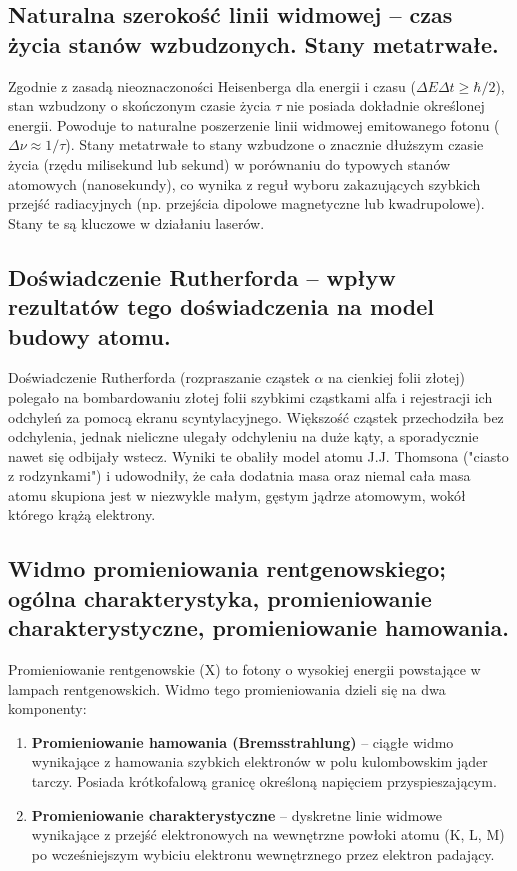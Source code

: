 \documentclass[11pt,a4paper]{article}
\begin{document}
\subsection{Naturalna szerokość linii widmowej -- czas życia stanów wzbudzonych. Stany metatrwałe.}
Zgodnie z zasadą nieoznaczoności Heisenberga dla energii i czasu ($\Delta E \Delta t \ge \hbar/2$), stan wzbudzony o skończonym czasie życia $\tau$ nie posiada dokładnie określonej energii. Powoduje to naturalne poszerzenie linii widmowej emitowanego fotonu ($\Delta \nu \approx 1/\tau$). Stany metatrwałe to stany wzbudzone o znacznie dłuższym czasie życia (rzędu milisekund lub sekund) w porównaniu do typowych stanów atomowych (nanosekundy), co wynika z reguł wyboru zakazujących szybkich przejść radiacyjnych (np. przejścia dipolowe magnetyczne lub kwadrupolowe). Stany te są kluczowe w działaniu laserów.

\subsection{Doświadczenie Rutherforda -- wpływ rezultatów tego doświadczenia na model budowy atomu.}
Doświadczenie Rutherforda (rozpraszanie cząstek $\alpha$ na cienkiej folii złotej) polegało na bombardowaniu złotej folii szybkimi cząstkami alfa i rejestracji ich odchyleń za pomocą ekranu scyntylacyjnego. Większość cząstek przechodziła bez odchylenia, jednak nieliczne ulegały odchyleniu na duże kąty, a sporadycznie nawet się odbijały wstecz. Wyniki te obaliły model atomu J.J. Thomsona ("ciasto z rodzynkami") i udowodniły, że cała dodatnia masa oraz niemal cała masa atomu skupiona jest w niezwykle małym, gęstym jądrze atomowym, wokół którego krążą elektrony.

\subsection{Widmo promieniowania rentgenowskiego; ogólna charakterystyka, promieniowanie charakterystyczne, promieniowanie hamowania.}
Promieniowanie rentgenowskie (X) to fotony o wysokiej energii powstające w lampach rentgenowskich. Widmo tego promieniowania dzieli się na dwa komponenty:
\begin{enumerate}
    \item \textbf{Promieniowanie hamowania (Bremsstrahlung)} -- ciągłe widmo wynikające z hamowania szybkich elektronów w polu kulombowskim jąder tarczy. Posiada krótkofalową granicę określoną napięciem przyspieszającym.
    \item \textbf{Promieniowanie charakterystyczne} -- dyskretne linie widmowe wynikające z przejść elektronowych na wewnętrzne powłoki atomu (K, L, M) po wcześniejszym wybiciu elektronu wewnętrznego przez elektron padający.
\end{enumerate}
\end{document}
